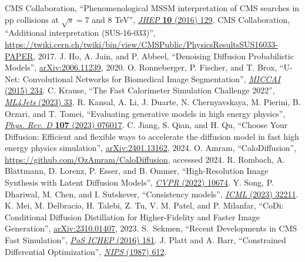 \begin{thebibliography}{99}
 CMS Collaboration, ``Phenomenological MSSM interpretation of CMS searches in pp collisions at $\sqrt{s} = 7$ and 8 TeV'', \href{https://doi.org/10.1007/JHEP10(2016)129}{\textit{JHEP} \textbf{10} (2016) 129}.
 CMS Collaboration, ``Additional interpretation (SUS-16-033)'', \href{https://twiki.cern.ch/twiki/bin/view/CMSPublic/PhysicsResultsSUS16033-PAPER}{https://twiki.cern.ch/twiki/bin/view/CMSPublic/PhysicsResultsSUS16033-PAPER}, 2017.
 J. Ho, A. Jain, and P. Abbeel, ``Denoising Diffusion Probabilistic Models'', \href{https://arxiv.org/abs/2006.11239}{arXiv:2006.11239}, 2020.
 O. Ronneberger, P. Fischer, and T. Brox, ``U-Net: Convolutional Networks for Biomedical Image Segmentation'', \href{https://doi.org/10.1007/978-3-319-24574-4_28}{\textit{MICCAI} (2015) 234}.
 C. Krause, ``The Fast Calorimeter Simulation Challenge 2022'', \href{https://indico.cern.ch/event/1253794/contributions/5588599/}{\textit{ML4Jets} (2023) 33}.
 R. Kansal, A. Li, J. Duarte, N. Chernyavskaya, M. Pierini, B. Orzari, and T. Tomei, ``Evaluating generative models in high energy physics'', \href{https://doi.org/10.1103/PhysRevD.107.076017}{\textit{Phys. Rev. D} \textbf{107} (2023) 076017}.
 C. Jiang, S. Qian, and H. Qu, ``Choose Your Diffusion: Efficient and flexible ways to accelerate the diffusion model in fast high energy physics simulation'', \href{https://arxiv.org/abs/2401.13162}{arXiv:2401.13162}, 2024.
 O. Amram, ``CaloDiffusion'', \href{https://github.com/OzAmram/CaloDiffusion}{https://github.com/OzAmram/CaloDiffusion}, accessed 2024.
 R. Rombach, A. Blattmann, D. Lorenz, P. Esser, and B. Ommer, ``High-Resolution Image Synthesis with Latent Diffusion Models'', \href{https://doi.ieeecomputersociety.org/10.1109/CVPR52688.2022.01042}{\textit{CVPR} (2022) 10674}.
 Y. Song, P. Dhariwal, M. Chen, and I. Sutskever, ``Consistency models'', \href{https://dl.acm.org/doi/10.5555/3618408.3619743}{\textit{ICML} (2023) 32211}.
 K. Mei, M. Delbracio, H. Talebi, Z. Tu, V. M. Patel, and P. Milanfar, ``CoDi: Conditional Diffusion Distillation for Higher-Fidelity and Faster Image Generation'', \href{https://arxiv.org/abs/2310.01407}{arXiv:2310.01407}, 2023.
 S.~Sekmen, ``Recent Developments in CMS Fast Simulation'', \href{https://doi.org/10.22323/1.282.0181}{\textit{PoS ICHEP} (2016) 181}.
 J. Platt and A. Barr, ``Constrained Differential Optimization'', \href{https://proceedings.neurips.cc/paper/1987/hash/a87ff679a2f3e71d9181a67b7542122c-Abstract.html}{\textit{NIPS} (1987) 612}.

\end{thebibliography}
